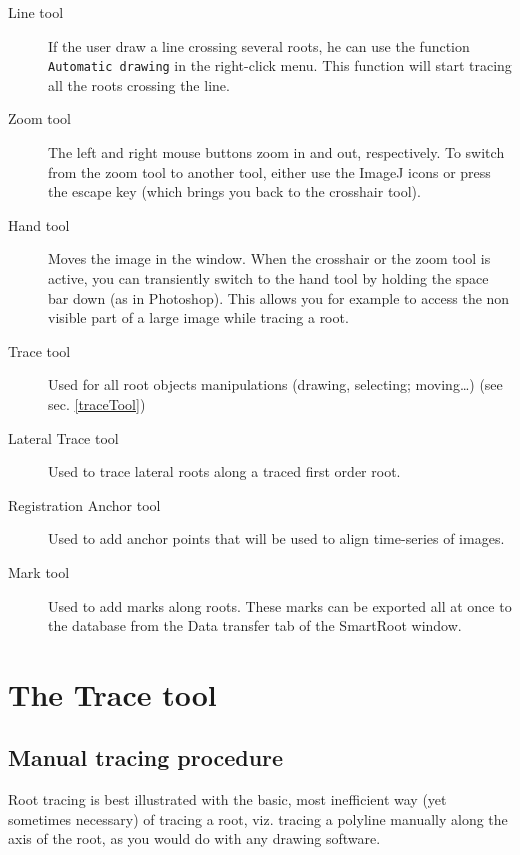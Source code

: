 \documentclass[a4paper,english,10pt]{report}
\begin{document}
\begin{description}

\item [Line tool] If the user draw a line crossing several roots, he can use the function \verb|Automatic drawing| in the right-click menu. This function will start tracing all the roots crossing the line. 

 \item [Zoom tool] The left and right mouse buttons zoom in and out, respectively. To switch from the zoom tool to another tool, either use the ImageJ icons or press the escape key (which brings you back to the crosshair tool).

\item[Hand tool] Moves the image in the window. When the crosshair or the zoom tool is active, you can transiently switch to the hand tool by holding the space bar down (as in Photoshop). This allows you for example to access the non visible part of a large image while tracing a root.

\item[Trace tool] Used for all root objects manipulations (drawing, selecting; moving…) (see sec. \ref{traceTool})

\item[Lateral Trace tool] Used to trace lateral roots along a traced first order root.

\item[Registration Anchor tool] Used to add anchor points that will be used to align time-series of images.

\item[Mark tool] Used to add marks along roots. These marks can be exported all at once to the database from the Data transfer tab of the SmartRoot window.
\end{description}


{\color{coolSection}\section{The Trace tool}}
\label{traceTool}

\subsection{Manual tracing procedure}
\label{manualTrace}

Root tracing is best illustrated with the basic, most inefficient way (yet sometimes necessary) of tracing a root, viz. tracing a polyline manually along the axis of the root, as you would do with any drawing software. \\
\end{document}
